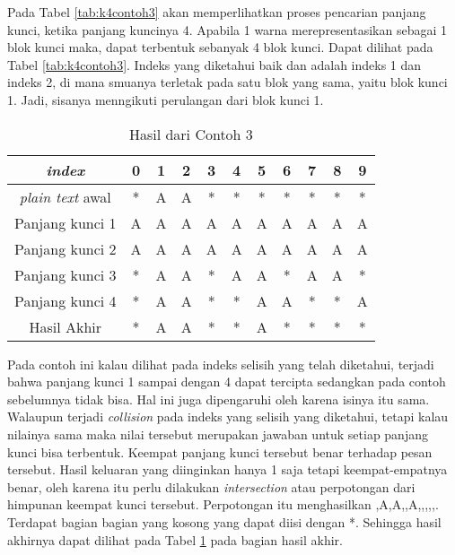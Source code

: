 	Pada Tabel \ref{tab:k4contoh3} akan memperlihatkan proses pencarian panjang kunci, ketika panjang kuncinya 4. Apabila 1 warna merepresentasikan sebagai 1 blok kunci maka, dapat terbentuk sebanyak 4 blok kunci. Dapat dilihat pada Tabel \ref{tab:k4contoh3}. Indeks yang diketahui baik \plaintext dan \ciphertext adalah indeks 1 dan indeks 2, di mana smuanya terletak pada satu blok yang sama, yaitu blok kunci 1. Jadi, sisanya menngikuti perulangan dari blok kunci 1. 
	
	\begin{table}[H]
		\centering
		\caption{Hasil dari Contoh 3}
		\begin{tabular}{|c|c|c|c|c|c|c|c|c|c|c|}\hline
		\textit{index}&0&1&2&3&4&5&6&7&8&9\\ \hline	
		\textit{plain text} awal&*&A&A&*&*&*&*&*&*&*\\ \hline
		Panjang kunci 1 &A&A&A&A&A&A&A&A&A&A\\ \hline
		Panjang kunci 2 &A&A&A&A&A&A&A&A&A&A\\ \hline
		Panjang kunci 3 &*&A&A&*&A&A&*&A&A&*\\ \hline
		Panjang kunci 4 &*&A&A&*&*&A&A&*&*&A\\ \hline
		Hasil Akhir     &*&A&A&*&*&A&*&*&*&*\\ \hline
		\end{tabular}
		\label{tab:res_contoh_3}
	\end{table}
	Pada contoh ini kalau dilihat pada indeks selisih yang telah diketahui, terjadi bahwa panjang kunci 1 sampai dengan 4 dapat tercipta sedangkan pada contoh sebelumnya tidak bisa. Hal ini juga dipengaruhi oleh karena isinya itu sama. Walaupun terjadi \textit{collision} pada indeks yang selisih yang diketahui, tetapi kalau nilainya sama maka nilai tersebut merupakan jawaban untuk setiap panjang kunci bisa terbentuk. Keempat panjang kunci tersebut benar terhadap pesan tersebut. Hasil keluaran yang diinginkan hanya 1 saja tetapi keempat-empatnya benar, oleh karena itu perlu dilakukan \textit{intersection} atau perpotongan dari himpunan keempat kunci tersebut. Perpotongan itu menghasilkan {,A,A,,A,,,,,}. Terdapat bagian bagian yang kosong yang dapat  diisi dengan *. Sehingga hasil akhirnya dapat dilihat pada Tabel \ref{tab:res_contoh_3} pada bagian hasil akhir.
	
